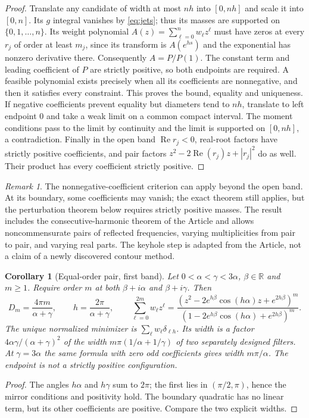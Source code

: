\documentclass[11pt]{article}
\newtheorem{corollary}[theorem]{Corollary}
\theoremstyle{remark}\newtheorem{remark}[theorem]{Remark}
\newcommand{\R}{\mathbb R}\newcommand{\C}{\mathbb C}\newcommand{\supp}{\operatorname{supp}}\newcommand{\diam}{\operatorname{diam}}\newcommand{\res}{\operatorname{Res}}\newcommand{\Ree}{\operatorname{Re}}\newcommand{\Imm}{\operatorname{Im}}\newcommand{\dd}{\,\mathrm d}
\begin{document}
\begin{proof}
Translate any candidate of width at most $nh$ into $[0,nh]$ and scale it into $[0,n]$. Its $g$ integral vanishes by \eqref{eq:jets}; thus its masses are supported on $\{0,1,\ldots,n\}$. Its weight polynomial $A(z)=\sum_{\ell=0}^n w_\ell z^\ell$ must have zeros at every $r_j$ of order at least $m_j$, since its transform is $A(e^{hs})$ and the exponential has nonzero derivative there. Consequently $A=P/P(1)$. The constant term and leading coefficient of $P$ are strictly positive, so both endpoints are required. A feasible polynomial exists precisely when all its coefficients are nonnegative, and then it satisfies every constraint. This proves the bound, equality and uniqueness. If negative coefficients prevent equality but diameters tend to $nh$, translate to left endpoint $0$ and take a weak limit on a common compact interval. The moment conditions pass to the limit by continuity and the limit is supported on $[0,nh]$, a contradiction. Finally in the open band $\Ree r_j<0$, real-root factors have strictly positive coefficients, and pair factors $z^2-2\Ree(r_j)z+|r_j|^2$ do as well. Their product has every coefficient strictly positive.
\end{proof}
\begin{remark}
The nonnegative-coefficient criterion can apply beyond the open band. At its boundary, some coefficients may vanish; the exact theorem still applies, but the perturbation theorem below requires strictly positive masses. The result includes the consecutive-harmonic theorem of the Article and allows noncommensurate pairs of reflected frequencies, varying multiplicities from pair to pair, and varying real parts. The keyhole step is adapted from the Article, not a claim of a newly discovered contour method.
\end{remark}

\begin{corollary}[Equal-order pair, first band]\label{cor:pair}
Let $0<\alpha<\gamma<3\alpha$, $\beta\in\R$ and $m\ge1$. Require order $m$ at both $\beta+i\alpha$ and $\beta+i\gamma$. Then
\[
 D_m=\frac{4\pi m}{\alpha+\gamma},\qquad h=\frac{2\pi}{\alpha+\gamma},\qquad
 \sum_{\ell=0}^{2m}w_\ell z^\ell=\frac{(z^2-2e^{h\beta}\cos(h\alpha)z+e^{2h\beta})^m}{(1-2e^{h\beta}\cos(h\alpha)+e^{2h\beta})^m}.
\]
The unique normalized minimizer is $\sum_\ell w_\ell\delta_{\ell h}$. Its width is a factor $4\alpha\gamma/(\alpha+\gamma)^2$ of the width $m\pi(1/\alpha+1/\gamma)$ of two separately designed filters. At $\gamma=3\alpha$ the same formula with zero odd coefficients gives width $m\pi/\alpha$. The endpoint is not a strictly positive configuration.
\end{corollary}
\begin{proof}
The angles $h\alpha$ and $h\gamma$ sum to $2\pi$; the first lies in $(\pi/2,\pi)$, hence the mirror conditions and positivity hold. The boundary quadratic has no linear term, but its other coefficients are positive. Compare the two explicit widths.
\end{proof}
\end{document}
